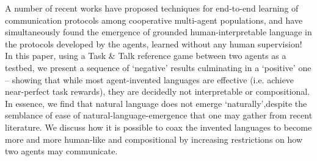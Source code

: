 A number of recent works have proposed techniques for end-to-end learning of communication protocols among cooperative multi-agent populations, and have simultaneously found the emergence of grounded human-interpretable language in the protocols developed by the agents, learned without any human supervision! In this paper, using a Task \& Talk reference game between two agents as a testbed,  we present a sequence of `negative' results culminating in a `positive' one -- showing that while most agent-invented languages are effective (i.e. achieve near-perfect task rewards), they are decidedly not interpretable or compositional. In essence, we find that natural language does not emerge `naturally',despite the semblance of ease of natural-language-emergence that one may gather from recent literature. We discuss how it is possible to coax the invented languages to become more and more human-like and compositional by increasing restrictions on how two agents may communicate.
